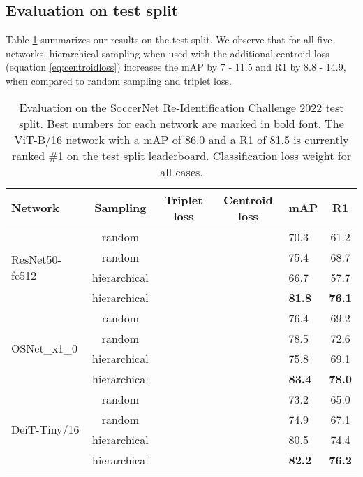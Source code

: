 \documentclass{article}
\begin{document}
\subsection{Evaluation on test split}

Table \ref{table:test_set_results} summarizes our results on the test split. We observe that for all five networks, hierarchical sampling when used with the additional centroid-loss (equation \ref{eq:centroidloss}) increases the mAP by 7 - 11.5 and R1 by 8.8 - 14.9, when compared to random sampling and triplet loss.

\begin{table}
  \caption{Evaluation on the SoccerNet Re-Identification Challenge 2022 test split. Best numbers for each network are marked in bold font. The ViT-B/16 network with a mAP of 86.0 and a R1 of 81.5 is currently ranked \#1 on the test split leaderboard. Classification loss weight  for all cases.}
  \label{table:test_set_results}
  \centering
  \begin{tabular}{@{}lccclc@{}}
    \toprule
Network & Sampling & Triplet loss & Centroid loss & mAP & R1 \\
    \midrule


    \multirow{4}{*}[-5pt]{ResNet50-fc512} & random &  &  & 70.3 & 61.2\\
\addlinespace[0.5em]
    & random &  &  & 75.4 & 68.7 \\
\addlinespace[0.5em]
    & hierarchical &  &  & 66.7 & 57.7\\
\addlinespace[0.5em]
    & hierarchical &  &  & \textbf{81.8} & \textbf{76.1}\\
    \midrule

    \multirow{4}{*}[-5pt]{OSNet\_x1\_0} & random &  &  & 76.4 & 69.2 \\
\addlinespace[0.5em]
    & random &  &  & 78.5 & 72.6\\
\addlinespace[0.5em]
    & hierarchical &  &  & 75.8 & 69.1\\
\addlinespace[0.5em]
    & hierarchical &  &  & \textbf{83.4} & \textbf{78.0}\\
    \midrule

    \multirow{4}{*}[-5pt]{DeiT-Tiny/16} & random &  &  & 73.2 & 65.0\\
\addlinespace[0.5em]
    & random &  &  & 74.9 & 67.1\\
\addlinespace[0.5em]
    & hierarchical &  &  & 80.5 & 74.4 \\
\addlinespace[0.5em]
    & hierarchical &  &  & \textbf{82.2} & \textbf{76.2}\\
    \midrule
    

\end{tabular}
\end{table}
\end{document}
